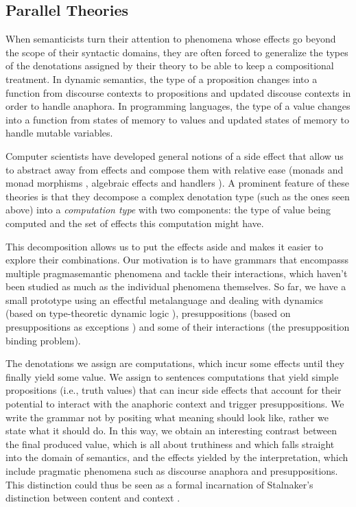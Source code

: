 \documentclass[a4paper,11pt,DIV=12]{scrartcl}
\begin{document}
\subsection{Parallel Theories}

When semanticists turn their attention to phenomena whose effects go beyond
the scope of their syntactic domains, they are often forced to generalize
the types of the denotations assigned by their theory to be able to keep a
compositional treatment. In dynamic semantics, the type of a proposition
changes into a function from discourse contexts to propositions and updated
discouse contexts in order to handle anaphora. In programming languages,
the type of a value changes into a function from states of memory to values
and updated states of memory to handle mutable variables.

Computer scientists have developed general notions of a side effect that
allow us to abstract away from effects and compose them with relative ease
(monads and monad morphisms \cite{moggi1990abstract}, algebraic effects and
handlers \cite{plotkin2013handling}). A prominent feature of these theories
is that they decompose a complex denotation type (such as the ones seen
above) into a \emph{computation type} with two components: the type of
value being computed and the set of effects this computation might have.

This decomposition allows us to put the effects aside and makes it easier
to explore their combinations. Our motivation is to have grammars that
encompasss multiple pragmasemantic phenomena and tackle their interactions,
which haven't been studied as much as the individual phenomena themselves.
So far, we have a small prototype using an effectful metalanguage and
dealing with dynamics (based on type-theoretic dynamic logic
\cite{de2006towards}), presuppositions (based on presuppositions as
exceptions \cite{lebedeva2012expression}) and some of their interactions
(the presupposition binding problem).

The denotations we assign are computations, which incur some effects until
they finally yield some value. We assign to sentences computations that
yield simple propositions (i.e., truth values) that can incur side effects
that account for their potential to interact with the anaphoric context and
trigger presuppositions. We write the grammar not by positing what meaning
should look like, rather we state what it should do. In this way, we obtain
an interesting contrast between the final produced value, which is all
about truthiness and which falls straight into the domain of semantics, and
the effects yielded by the interpretation, which include pragmatic
phenomena such as discourse anaphora and presuppositions. This distinction
could thus be seen as a formal incarnation of Stalnaker's distinction
between content and context \cite{stalnaker1974pragmatic}.



\end{document}
